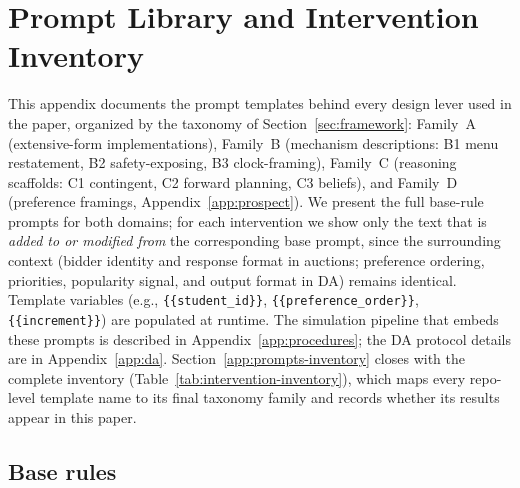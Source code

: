 \section{Prompt Library and Intervention Inventory}\label{app:prompts}

This appendix documents the prompt templates behind every design lever used in the paper, organized by the taxonomy of Section~\ref{sec:framework}: Family~A (extensive-form implementations), Family~B (mechanism descriptions: B1 menu restatement, B2 safety-exposing, B3 clock-framing), Family~C (reasoning scaffolds: C1 contingent, C2 forward planning, C3 beliefs), and Family~D (preference framings, Appendix~\ref{app:prospect}). We present the full base-rule prompts for both domains; for each intervention we show only the text that is \emph{added to or modified from} the corresponding base prompt, since the surrounding context (bidder identity and response format in auctions; preference ordering, priorities, popularity signal, and output format in DA) remains identical. Template variables (e.g., \texttt{\{\{student\_id\}\}}, \texttt{\{\{preference\_order\}\}}, \texttt{\{\{increment\}\}}) are populated at runtime. The simulation pipeline that embeds these prompts is described in Appendix~\ref{app:procedures}; the DA protocol details are in Appendix~\ref{app:da}. Section~\ref{app:prompts-inventory} closes with the complete inventory (Table~\ref{tab:intervention-inventory}), which maps every repo-level template name to its final taxonomy family and records whether its results appear in this paper.

\subsection{Base rules}\label{app:prompts-base}

